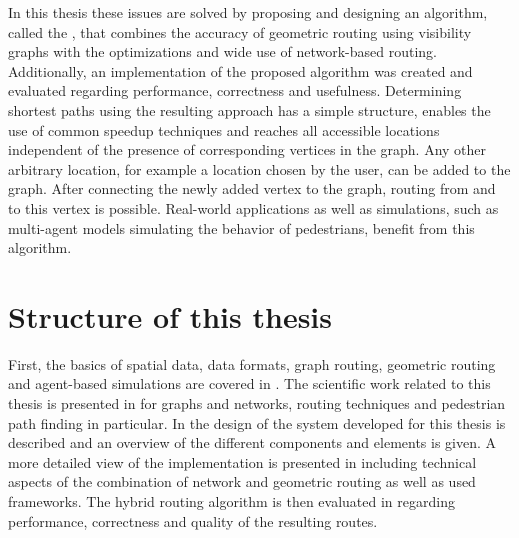 	In this thesis these issues are solved by proposing and designing an algorithm, called the , that combines the accuracy of geometric routing using visibility graphs with the optimizations and wide use of network-based routing.
	Additionally, an implementation of the proposed algorithm was created and evaluated regarding performance, correctness and usefulness.
	Determining shortest paths using the resulting approach has a simple structure, enables the use of common speedup techniques and reaches all accessible locations independent of the presence of corresponding vertices in the graph.
	Any other arbitrary location, for example a location chosen by the user, can be added to the graph.
	After connecting the newly added vertex to the graph, routing from and to this vertex is possible.
	Real-world applications as well as simulations, such as multi-agent models simulating the behavior of pedestrians, benefit from this algorithm.
	
\section{Structure of this thesis}

	First, the basics of spatial data, data formats, graph routing, geometric routing and agent-based simulations are covered in .
	The scientific work related to this thesis is presented in  for graphs and networks, routing techniques and pedestrian path finding in particular.
	In  the design of the system developed for this thesis is described and an overview of the different components and elements is given.
	A more detailed view of the implementation is presented in  including technical aspects of the combination of network and geometric routing as well as used frameworks.
	The hybrid routing algorithm is then evaluated in  regarding performance, correctness and quality of the resulting routes.
	
